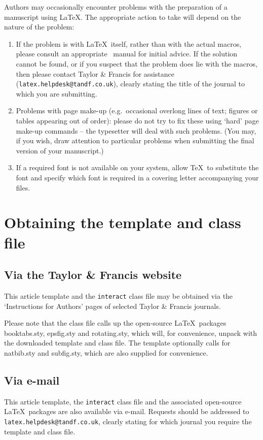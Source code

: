 \documentclass[]{interact}
\theoremstyle{plain}%
\theoremstyle{definition}
\theoremstyle{remark}
\begin{document}
Authors may occasionally encounter problems with the preparation of a manuscript using \LaTeX. The appropriate action to take will depend on the nature of the problem:
\begin{enumerate}
\item[(i)] If the problem is with \LaTeX\ itself, rather than with the actual macros, please consult an appropriate \LaTeXe\ manual for initial advice. If the solution cannot be found, or if you suspect that the problem does lie with the macros, then please contact Taylor \& Francis for assistance (\texttt{latex.helpdesk@tandf.co.uk}), clearly stating the title of the journal to which you are submitting.
\item[(ii)] Problems with page make-up (e.g.\ occasional overlong lines of text; figures or tables appearing out of order): please do not try to fix these using `hard' page make-up commands -- the typesetter will deal with such problems. (You may, if you wish, draw attention to particular problems when submitting the final version of your manuscript.)
\item[(iii)] If a required font is not available on your system, allow \TeX\ to substitute the font and specify which font is required in a covering letter accompanying your files.
\end{enumerate}


\section{Obtaining the template and class file}

\subsection{Via the Taylor \& Francis website}

This article template and the \texttt{interact} class file may be obtained via the `Instructions for Authors' pages of selected Taylor \& Francis journals.

Please note that the class file calls up the open-source \LaTeX\ packages booktabs.sty, epsfig.sty and rotating.sty, which will, for convenience, unpack with the downloaded template and class file. The template optionally calls for natbib.sty and subfig.sty, which are also supplied for convenience.


\subsection{Via e-mail}

This article template, the \texttt{interact} class file and the associated open-source \LaTeX\ packages are also available via e-mail. Requests should be addressed to \texttt{latex.helpdesk@tandf.co.uk}, clearly stating for which journal you require the template and class file.
\end{document}
